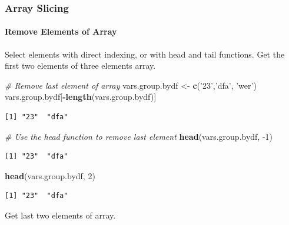 \documentclass[
]{book}
\newenvironment{Shaded}{\begin{snugshade}}{\end{snugshade}}
\newcommand{\CommentTok}[1]{\textcolor[rgb]{0.56,0.35,0.01}{\textit{#1}}}
\newcommand{\DecValTok}[1]{\textcolor[rgb]{0.00,0.00,0.81}{#1}}
\newcommand{\KeywordTok}[1]{\textcolor[rgb]{0.13,0.29,0.53}{\textbf{#1}}}
\newcommand{\NormalTok}[1]{#1}
\newcommand{\OperatorTok}[1]{\textcolor[rgb]{0.81,0.36,0.00}{\textbf{#1}}}
\newcommand{\StringTok}[1]{\textcolor[rgb]{0.31,0.60,0.02}{#1}}
\begin{document}
\hypertarget{array-slicing}{%
\subsubsection{Array Slicing}\label{array-slicing}}

\hypertarget{remove-elements-of-array}{%
\paragraph{Remove Elements of Array}\label{remove-elements-of-array}}

Select elements with direct indexing, or with head and tail functions. Get the first two elements of three elements array.

\begin{Shaded}
\begin{Highlighting}[]
\CommentTok{# Remove last element of array}
\NormalTok{vars.group.bydf <-}\StringTok{ }\KeywordTok{c}\NormalTok{(}\StringTok{'23'}\NormalTok{,}\StringTok{'dfa'}\NormalTok{, }\StringTok{'wer'}\NormalTok{)}
\NormalTok{vars.group.bydf[}\OperatorTok{-}\KeywordTok{length}\NormalTok{(vars.group.bydf)]}
\end{Highlighting}
\end{Shaded}

\begin{verbatim}
[1] "23"  "dfa"
\end{verbatim}

\begin{Shaded}
\begin{Highlighting}[]
\CommentTok{# Use the head function to remove last element}
\KeywordTok{head}\NormalTok{(vars.group.bydf, }\DecValTok{-1}\NormalTok{)}
\end{Highlighting}
\end{Shaded}

\begin{verbatim}
[1] "23"  "dfa"
\end{verbatim}

\begin{Shaded}
\begin{Highlighting}[]
\KeywordTok{head}\NormalTok{(vars.group.bydf, }\DecValTok{2}\NormalTok{)}
\end{Highlighting}
\end{Shaded}

\begin{verbatim}
[1] "23"  "dfa"
\end{verbatim}

Get last two elements of array.
\end{document}
